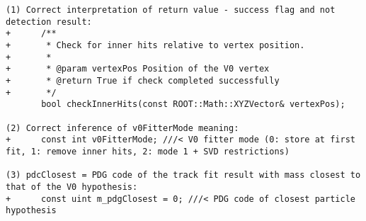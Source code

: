 \begin{verbatim}
(1) Correct interpretation of return value - success flag and not detection result:
+      /**
+       * Check for inner hits relative to vertex position.
+       * 
+       * @param vertexPos Position of the V0 vertex
+       * @return True if check completed successfully
+       */
       bool checkInnerHits(const ROOT::Math::XYZVector& vertexPos);

(2) Correct inference of v0FitterMode meaning:
+      const int v0FitterMode; ///< V0 fitter mode (0: store at first fit, 1: remove inner hits, 2: mode 1 + SVD restrictions)

(3) pdcClosest = PDG code of the track fit result with mass closest to that of the V0 hypothesis:
+      const uint m_pdgClosest = 0; ///< PDG code of closest particle hypothesis
\end{verbatim}